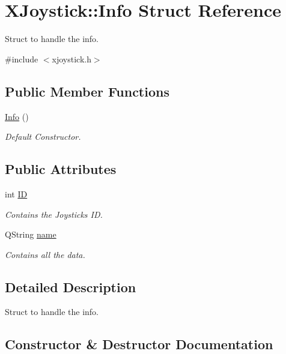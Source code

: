 \hypertarget{struct_x_joystick_1_1_info}{}\section{X\+Joystick\+:\+:Info Struct Reference}
\label{struct_x_joystick_1_1_info}


Struct to handle the info.  




{\ttfamily \#include $<$xjoystick.\+h$>$}

\subsection*{Public Member Functions}
\begin{DoxyCompactItemize}
\item 
\hyperlink{struct_x_joystick_1_1_info_a03da2d18c0c184642e38a2313935d696}{Info} ()
\begin{DoxyCompactList}\small\item\em Default Constructor. \end{DoxyCompactList}\end{DoxyCompactItemize}
\subsection*{Public Attributes}
\begin{DoxyCompactItemize}
\item 
int \hyperlink{struct_x_joystick_1_1_info_ac94ec072c56923d48b69b402f5d8558a}{I\+D}
\begin{DoxyCompactList}\small\item\em Contains the Joystick\textquotesingle{}s I\+D. \end{DoxyCompactList}\item 
Q\+String \hyperlink{struct_x_joystick_1_1_info_afd89ff5f20e52a31601e643229a337c9}{name}
\begin{DoxyCompactList}\small\item\em Contains all the data. \end{DoxyCompactList}\end{DoxyCompactItemize}


\subsection{Detailed Description}
Struct to handle the info. 

\subsection{Constructor \& Destructor Documentation}
\hypertarget{struct_x_joystick_1_1_info_a03da2d18c0c184642e38a2313935d696}{}
